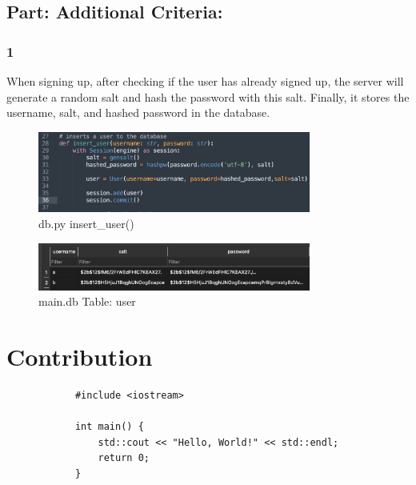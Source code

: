 \documentclass[12pt]{article}
\begin{document}
    \subsection*{Part: Additional Criteria:}

        \subsubsection*{1} When signing up, after checking if the user has already signed up, the server will generate a random salt and hash the password with this salt. Finally, it stores the username, salt, and hashed password in the database.

        \begin{figure}[h]
            \centering
            \includegraphics[width=0.8\textwidth]{graphs/insert_user.jpg}
            \caption{db.py insert\_user()}
        \end{figure}

        \begin{figure}[h]
            \centering
            \includegraphics[width=0.8\textwidth]{graphs/hashed_passwd.jpg}
            \caption{main.db Table: user}
        \end{figure}



\section{Contribution}

        \begin{verbatim}
            #include <iostream>

            int main() {
                std::cout << "Hello, World!" << std::endl;
                return 0;
            }
        \end{verbatim}
\end{document}

